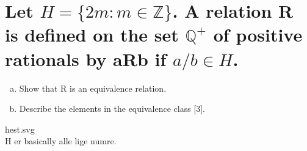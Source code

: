 \newpage
\section{Let $H = \{2m : m\in \mathbb{Z}\}$. A relation R is defined on the set $\mathbb{Q}^{+}$ of positive rationals by aRb if $a/b\in H$.}
\begin{enumerate}[a.]
\item Show that R is an equivalence relation.
\item Describe the elements in the equivalence class [3].
\end{enumerate}
hest.svg\\
H er basically alle lige numre.
\newpage
